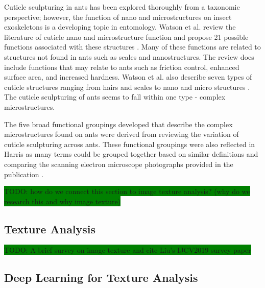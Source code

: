\documentclass{aci}
\numberwithin{equation}{section}
\begin{document}
Cuticle sculpturing in ants has been explored thoroughly from a taxonomic
perspective; however, the function of nano and microstructures on insect
exoskeletons is a developing topic in entomology. Watson et al. review the
literature of cuticle nano and microstructure function and propose 21 possible
functions associated with these structures \cite{watson_diversity_2017}. Many of
these functions are related to structures not found in ants such as scales and
nanostructures. The review does include functions that may relate to ants such
as friction control, enhanced surface area, and increased hardness.  Watson et
al. also describe seven types of cuticle structures ranging from hairs and
scales to nano and micro structures \cite{watson_diversity_2017}. The cuticle
sculpturing of ants seems to fall within one type - complex microstructures.

The five broad functional groupings developed that describe the complex
microstructures found on ants were derived from reviewing the variation of
cuticle sculpturing across ants. These functional groupings were also reflected
in Harris as many terms could be grouped together based on similar definitions
and comparing the scanning electron microscope photographs provided in the
publication \cite{harris_glossary_1979}.

\colorbox{green}{TODO: how do we connect this section to image texture analysis?
    (why do we research this and why image texture) }

\subsection{Texture Analysis}
\colorbox{green}{TODO: A brief survey on image texture and cite Liu's
    IJCV2019 survey paper}

\subsection{Deep Learning for Texture Analysis}
\end{document}
